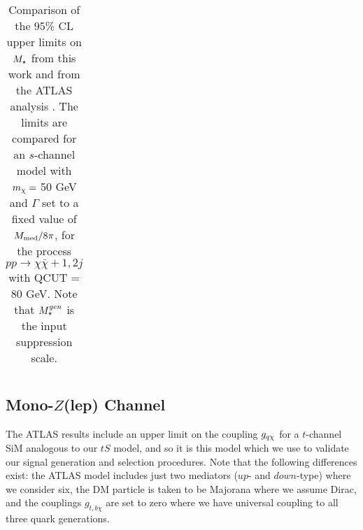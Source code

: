 \begin{table}[!htbp]
\begin{tabular}{c|c|c|c}
 \hline
 \hline
\end{tabular}
\caption{Comparison of the 95\% CL upper limits on $M_{\star}$ from this work and from the ATLAS \monojet analysis \cite{Aad:2015zva}. The limits are compared for an $s$-channel model with $m_{\chi} = $ 50 GeV and $\Gamma$ set to a fixed value of $M_{\mathrm{med}}/8\pi$, for the process $pp \rightarrow \chi \bar{\chi} + 1, 2j$ with QCUT = 80 GeV. Note that $M_{\star}^{\tiny gen}$ is the input suppression scale.}
\label{M_star_limits_monojet}
\end{table}

\subsection{Mono-$Z$(lep) Channel}
\label{monoZ_validation}

The ATLAS \monoZ results include an upper limit on the coupling $g_{q \chi}$ for a $t$-channel SiM analogous to our $tS$ model, and so it is this model which we use to validate our signal generation and selection procedures. Note that the following differences exist: the ATLAS model includes just two mediators ($up$- and $down$-type) where we consider six, the DM particle is taken to be Majorana where we assume Dirac, and the couplings $g_{t,b \chi}$ are set to zero where we have universal coupling to all three quark generations.

